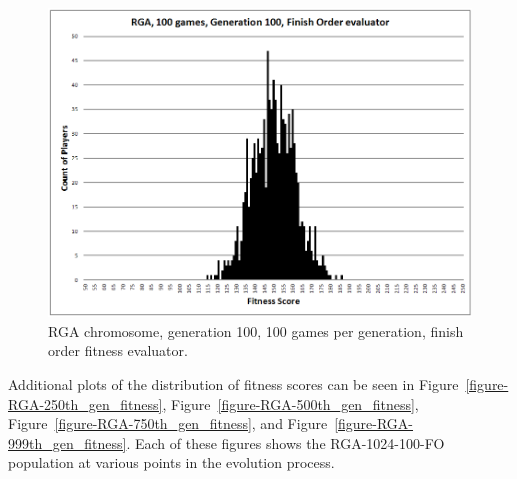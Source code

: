 \begin{figure}[htp]
\centerline{\includegraphics[width=0.75\columnwidth]{Figures/RGA_1024_G100_N100_FO.png}}
\caption[RGA Fitness Distribution, 100th Generation]{RGA chromosome, generation
100, 100 games per generation, finish order fitness evaluator.}
\label{figure-100th_gen_fitness}
\end{figure}

Additional plots of the distribution of fitness scores can be seen in
Figure~\ref{figure-RGA-250th_gen_fitness},
Figure~\ref{figure-RGA-500th_gen_fitness},
Figure~\ref{figure-RGA-750th_gen_fitness}, and
Figure~\ref{figure-RGA-999th_gen_fitness}. Each of these figures shows the
RGA-1024-100-FO population at various points in the evolution process.

